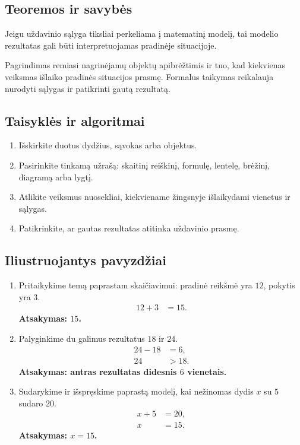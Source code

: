 \subsection{Teoremos ir savybės}
\begin{savybe}
Jeigu uždavinio sąlyga tiksliai perkeliama į matematinį modelį, tai modelio rezultatas gali būti interpretuojamas pradinėje situacijoje.
\end{savybe}
\begin{pastaba}
Pagrindimas remiasi nagrinėjamų objektų apibrėžtimis ir tuo, kad kiekvienas veiksmas išlaiko pradinės situacijos prasmę. Formalus taikymas reikalauja nurodyti sąlygas ir patikrinti gautą rezultatą.
\end{pastaba}

\subsection{Taisyklės ir algoritmai}
\begin{enumerate}[label=\arabic*.]
\item Išskirkite duotus dydžius, sąvokas arba objektus.
\item Pasirinkite tinkamą užrašą: skaitinį reiškinį, formulę, lentelę, brėžinį, diagramą arba lygtį.
\item Atlikite veiksmus nuosekliai, kiekviename žingsnyje išlaikydami vienetus ir sąlygas.
\item Patikrinkite, ar gautas rezultatas atitinka uždavinio prasmę.
\end{enumerate}

\subsection{Iliustruojantys pavyzdžiai}
\begin{enumerate}[label=\arabic*.]
\item Pritaikykime temą paprastam skaičiavimui: pradinė reikšmė yra \(12\), pokytis yra \(3\).
\begin{align}
12+3&=15.
\end{align}
\textbf{Atsakymas: \(15\).}
\item Palyginkime du galimus rezultatus \(18\) ir \(24\).
\begin{align}
24-18&=6,\\
24&>18.
\end{align}
\textbf{Atsakymas: antras rezultatas didesnis \(6\) vienetais.}
\item Sudarykime ir išspręskime paprastą modelį, kai nežinomas dydis \(x\) su \(5\) sudaro \(20\).
\begin{align}
x+5&=20,\\
x&=15.
\end{align}
\textbf{Atsakymas: \(x=15\).}
\end{enumerate}

